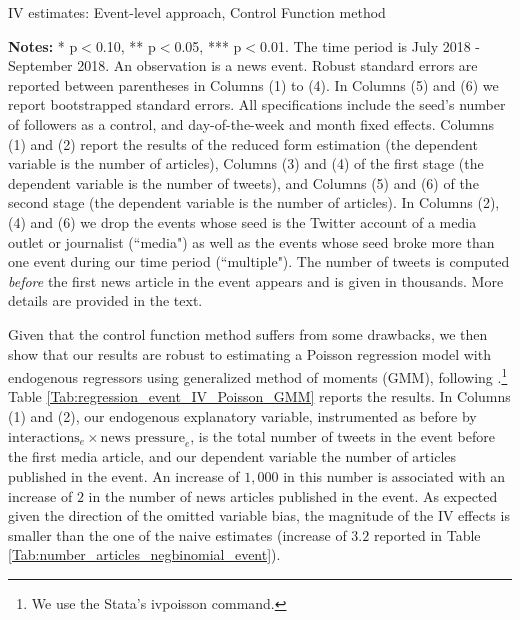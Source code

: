 \begin{table}
\caption{IV estimates: Event-level approach, Control Function method}
\begin{center}
	
\end{center}
\begin{spacing}{0.5}
	{\fns \textbf{Notes:} * p$<$0.10, ** p$<$0.05, *** p$<$0.01. The time period is July 2018 - September 2018.  An observation is a news event. Robust standard errors are reported between parentheses in Columns (1) to (4). In Columns (5) and (6) we report bootstrapped standard errors. All specifications include the seed's number of followers as a control, and day-of-the-week and month fixed effects. Columns (1) and (2) report the results of the reduced form estimation (the dependent variable is the number of articles), Columns (3) and (4) of the first stage (the dependent variable is the number of tweets), and Columns (5) and (6) of the second stage (the dependent variable is the number of articles). In Columns (2), (4) and (6) we drop the events whose seed is the Twitter account of a media outlet or journalist (``media") as well as the events whose seed broke more than one event during our time period (``multiple"). The number of tweets is computed \textit{before} the first news article in the event appears and is given in thousands. More details are provided in the text.}
\end{spacing}
\label{Tab:regression_event_IV_CF}
\end{table} 


Given that the control function method suffers from some drawbacks, we then show that our results are robust to estimating a Poisson regression model with endogenous regressors using generalized method of moments (GMM), following \citet{WindmeijerSantos1997}.\footnote{We use the Stata's ivpoisson command.} Table \ref{Tab:regression_event_IV_Poisson_GMM} reports the results. In Columns (1) and (2), our endogenous explanatory variable, instrumented as before by $\text{interactions}_{e} \times \text{news pressure}_{e}$, is the total number of tweets in the event before the first media article, and our dependent variable the number of articles published in the event. An increase of $1,000$ in this number is associated with an increase of $2$ in the number of news articles published in the event. As expected given the direction of the omitted variable bias, the magnitude of the IV effects is smaller than the one of the naive estimates (increase of $3.2$ reported in Table \ref{Tab:number_articles_negbinomial_event}). 

